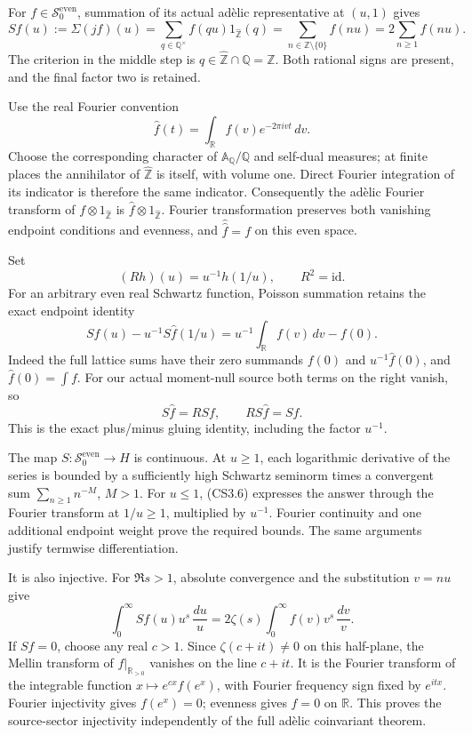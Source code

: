 For \(f\in\mathcal S_0^{\mathrm{even}}\), summation of its actual adèlic
representative at \((u,1)\) gives \[
S f(u):=\Sigma(jf)(u)
=\sum_{q\in\mathbb Q^\times}f(qu)1_{\widehat{\mathbb Z}}(q)
=\sum_{n\in\mathbb Z\setminus\{0\}}f(nu)
=2\sum_{n\ge1}f(nu).
\tag{CS3.2}
\] The criterion in the middle step is
\(q\in\widehat{\mathbb Z}\cap\mathbb Q=\mathbb Z\). Both rational signs
are present, and the final factor two is retained.

Use the real Fourier convention \[
\widehat f(t)=\int_{\mathbb R}f(v)e^{-2\pi ivt}\,dv.
\tag{CS3.3}
\] Choose the corresponding character of
\(\mathbb A_{\mathbb Q}/\mathbb Q\) and self-dual measures; at finite
places the annihilator of \(\widehat{\mathbb Z}\) is itself, with volume
one. Direct Fourier integration of its indicator is therefore the same
indicator. Consequently the adèlic Fourier transform of
\(f\otimes1_{\widehat{\mathbb Z}}\) is
\(\widehat f\otimes1_{\widehat{\mathbb Z}}\). Fourier transformation
preserves both vanishing endpoint conditions and evenness, and
\(\widehat{\widehat f}=f\) on this even space.

Set \[
(Rh)(u)=u^{-1}h(1/u),\qquad R^2=\mathrm{id}.
\tag{CS3.4}
\] For an arbitrary even real Schwartz function, Poisson summation
retains the exact endpoint identity \[
S f(u)-u^{-1}S\widehat f(1/u)
=u^{-1}\int_{\mathbb R}f(v)\,dv-f(0).
\tag{CS3.5}
\] Indeed the full lattice sums have their zero summands \(f(0)\) and
\(u^{-1}\widehat f(0)\), and \(\widehat f(0)=\int f\). For our actual
moment-null source both terms on the right vanish, so \[
S\widehat f=R S f,\qquad
R S\widehat f=S f.
\tag{CS3.6}
\] This is the exact plus/minus gluing identity, including the factor
\(u^{-1}\).

The map \(S:\mathcal S_0^{\mathrm{even}}\to H\) is continuous. At
\(u\ge1\), each logarithmic derivative of the series is bounded by a
sufficiently high Schwartz seminorm times a convergent sum
\(\sum_{n\ge1}n^{-M}\), \(M>1\). For \(u\le1\), (CS3.6) expresses the
answer through the Fourier transform at \(1/u\ge1\), multiplied by
\(u^{-1}\). Fourier continuity and one additional endpoint weight prove
the required bounds. The same arguments justify termwise
differentiation.

It is also injective. For \(\Re s>1\), absolute convergence and the
substitution \(v=nu\) give \[
\int_0^\infty S f(u)u^s\,\frac{du}{u}
=2\zeta(s)\int_0^\infty f(v)v^s\,\frac{dv}{v}.
\tag{CS3.7}
\] If \(Sf=0\), choose any real \(c>1\). Since \(\zeta(c+it)\ne0\) on
this half-plane, the Mellin transform of \(f|_{\mathbb R_{>0}}\)
vanishes on the line \(c+it\). It is the Fourier transform of the
integrable function \(x\mapsto e^{cx}f(e^x)\), with Fourier frequency
sign fixed by \(e^{itx}\). Fourier injectivity gives \(f(e^x)=0\);
evenness gives \(f=0\) on \(\mathbb R\). This proves the source-sector
injectivity independently of the full adèlic coinvariant theorem.

